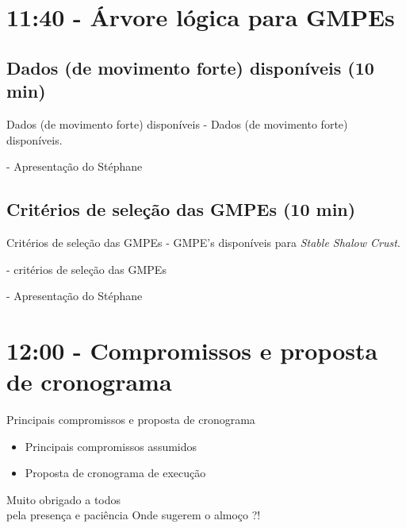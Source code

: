 \documentclass[ucs,8pt]{beamer}
\begin{document}
\section{11:40 - Árvore lógica para GMPEs}


	\subsection{Dados (de movimento forte) disponíveis (10 min)}
	\begin{frame}{Dados (de movimento forte) disponíveis}
		- Dados (de movimento forte) disponíveis.
		
		- Apresentação do Stéphane
	\end{frame}


	\subsection{Critérios de seleção das GMPEs (10 min)}
	\begin{frame}{Critérios de seleção das GMPEs}
		- GMPE's disponíveis para \emph{Stable Shalow Crust}.
	
		- critérios de seleção das GMPEs
		
		- Apresentação do Stéphane
	\end{frame}



\section{12:00 - Compromissos e proposta de cronograma}

	\begin{frame}{Principais compromissos e proposta de cronograma}
		\begin{itemize}
			\item Principais compromissos assumidos
			\item  Proposta de cronograma de execução
		\end{itemize}
	\end{frame}


	\begin{frame}{Muito obrigado a todos \\
				  pela presença e paciência}
		Onde sugerem o almoço ?!
	\end{frame}
\end{document}
